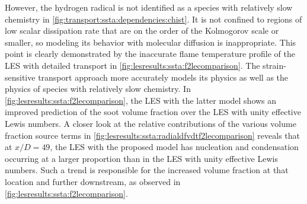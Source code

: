 However, the hydrogen radical is not identified as a species with relatively slow chemistry in \cref{fig:transport:ssta:dependencies:chist}. It is not confined to regions of low scalar dissipation rate that are on the order of the Kolmogorov scale or smaller, so modeling its behavior with molecular diffusion is inappropriate. This point is clearly demonstrated by the inaccurate flame temperature profile of the LES with detailed transport in \cref{fig:lesresults:ssta:f2lecomparison}. The strain-sensitive transport approach more accurately models its physics as well as the physics of species with relatively slow chemistry. In \cref{fig:lesresults:ssta:f2lecomparison}, the LES with the latter model shows an improved prediction of the soot volume fraction over the LES with unity effective Lewis numbers. A closer look at the relative contributions of the various volume fraction source terms in \cref{fig:lesresults:ssta:radialdfvdtf2lecomparison} reveals that at $x/D = 49$, the LES with the proposed model has nucleation and condensation occurring at a larger proportion than in the LES with unity effective Lewis numbers. Such a trend is responsible for the increased volume fraction at that location and further downstream, as observed in \cref{fig:lesresults:ssta:f2lecomparison}.



